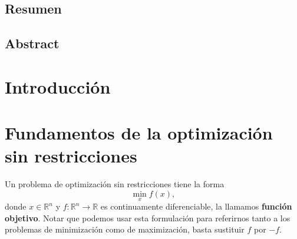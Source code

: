 \documentclass[11pt,a4paper]{book}
\theoremstyle{definition}
\theoremstyle{remark}
\begin{document}
\section*{Resumen}





\vspace{1.5cm}

\section*{Abstract}






\clearpage

\thispagestyle{empty}


\chapter*{Introducci\'on}



\mainmatter




\chapter{Fundamentos de la optimización sin restricciones}

Un problema de optimización sin restricciones tiene la forma 
\begin{equation}
	\min_{x}f\left(x\right),
	\label{eq:minf}
\end{equation}
donde $x\in\mathbb{R}^{n}$ y $f : \mathbb{R}^{n} \rightarrow \mathbb{R}$ es continuamente diferenciable, la llamamos \textbf{función objetivo}. 
Notar que podemos usar esta formulación para referirnos tanto a los problemas de minimización como de maximización, basta sustituir $f$ por $-f$. 
\end{document}

